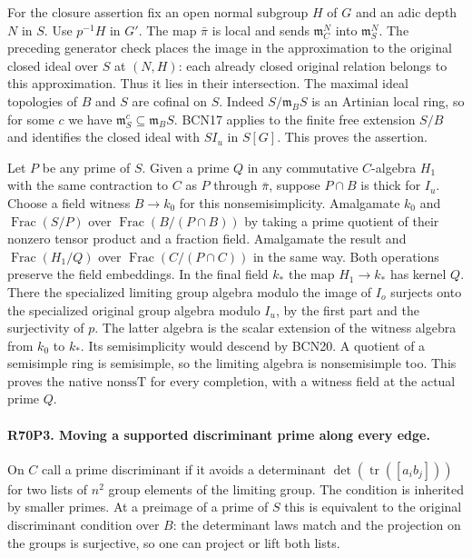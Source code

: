 For the closure assertion fix an open normal subgroup $H$ of
$G$ and an adic depth $N$ in $S$. Use $p^{-1}H$ in $G'$.
The map $\bar\pi$ is local and sends $\mathfrak m_C^N$ into
$\mathfrak m_S^N$. The preceding generator check places
the image in the approximation to the original closed ideal
over $S$ at $(N,H)$: each already closed original relation
belongs to this approximation. Thus it lies in their intersection.
The maximal ideal topologies of $B$ and $S$ are cofinal on $S$.
Indeed $S/\mathfrak m_BS$ is an Artinian local ring, so for
some $c$ we have $\mathfrak m_S^c\subseteq\mathfrak m_BS$.
BCN17 applies to the finite free extension $S/B$ and identifies
the closed ideal with $SI_u$ in $S[G]$. This proves the assertion.

Let $P$ be any prime of $S$. Given a prime $Q$ in any commutative
$C$-algebra $H_1$ with the same contraction to $C$ as $P$ through
$\bar\pi$, suppose $P\cap B$ is thick for $I_u$. Choose a field
witness $B\to k_0$ for this nonsemisimplicity. Amalgamate $k_0$
and $\operatorname{Frac}(S/P)$ over $\operatorname{Frac}(B/(P\cap B))$
by taking a prime quotient of their nonzero tensor product and
a fraction field. Amalgamate the result and
$\operatorname{Frac}(H_1/Q)$ over $\operatorname{Frac}(C/(P\cap C))$
in the same way. Both operations preserve the field embeddings.
In the final field $k_*$ the map $H_1\to k_*$ has kernel $Q$.
There the specialized limiting group algebra modulo the image of
$I_o$ surjects onto the specialized original group algebra modulo
$I_u$, by the first part and the surjectivity of $p$.
The latter algebra is the scalar extension of the witness algebra
from $k_0$ to $k_*$. Its semisimplicity would descend by BCN20.
A quotient of a semisimple ring is semisimple, so the limiting
algebra is nonsemisimple too. This proves the native
$\mathrm{nonssT}$ for every completion, with a witness field
at the actual prime $Q$.

\paragraph{R70P3. Moving a supported discriminant prime along every edge.}
On $C$ call a prime discriminant if it avoids a determinant
$\det(\operatorname{tr}([a_i b_j]))$ for two lists of $n^2$
group elements of the limiting group. The condition is inherited
by smaller primes. At a preimage of a prime of $S$ this is
equivalent to the original discriminant condition over $B$:
the determinant laws match and the projection on the groups is
surjective, so one can project or lift both lists.

